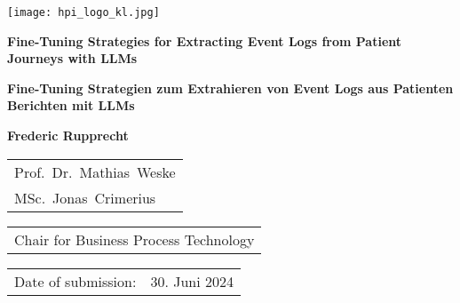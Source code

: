 \begin{titlepage}
	\begin{flushright}
		\texttt{[image: hpi\_logo\_kl.jpg]}
	\end{flushright}
	\begin{center}
		\hbox{}
		\vfill
		{\huge\bfseries Fine-Tuning Strategies for Extracting Event Logs from Patient Journeys with LLMs \par}
		\vskip 0.5cm
		{\huge\bfseries Fine-Tuning Strategien zum Extrahieren von Event Logs aus Patienten Berichten mit LLMs \par}
		\vskip 1.5cm
		\textbf{Frederic Rupprecht}\\
		\vskip 1.5cm
		\begin{tabular}{l}
			Prof.~Dr.~Mathias~Weske \\
			MSc.~Jonas~Crimerius \\
		\end{tabular}
		\vskip 0.25cm
		\begin{tabular}{l}
			Chair for  Business Process Technology
		\end{tabular}
		\vskip 1.5cm
		\begin{tabular}{ll}
			Date of submission: & 30. Juni 2024 \\
		\end{tabular}
	\end{center}	
	\vfill
\end{titlepage}

